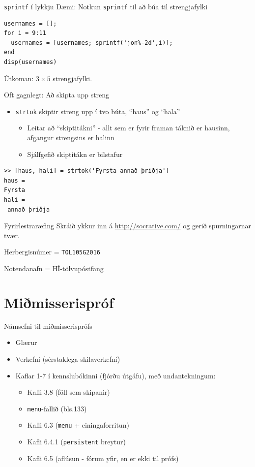 \documentclass{beamer}
\begin{document}
\begin{frame}[fragile]{\texttt{sprintf} í lykkju}
Dæmi: Notkun \texttt{sprintf} til að búa til strengjafylki

\begin{verbatim}
usernames = [];
for i = 9:11
  usernames = [usernames; sprintf('jon%-2d',i)];
end
disp(usernames)
\end{verbatim}
Útkoman: $3\times 5$ strengjafylki.
\end{frame}

\begin{frame}[fragile]{Oft gagnlegt: Að skipta upp streng}
\begin{itemize}
  \item \texttt{strtok} skiptir streng upp í tvo búta, ``haus'' og ``hala''
  \begin{itemize}
   \item Leitar að ``skiptitákni'' - allt sem er fyrir framan táknið er hausinn, afgangur strengsins er halinn
   \item Sjálfgefið skiptitákn er bilstafur
  \end{itemize}
\end{itemize}
\begin{verbatim}
>> [haus, hali] = strtok('Fyrsta annað þriðja')
haus =
Fyrsta
hali =
 annað þriðja
\end{verbatim}

\end{frame}


\begin{frame}{Fyrirlestraræfing}
Skráið ykkur inn á \url{http://socrative.com/} og gerið spurningarnar tvær.

Herbergisnúmer = \texttt{TOL105G2016}

Notendanafn = HÍ-tölvupóstfang
\end{frame}

\section{Miðmisserispróf}

\begin{frame}{Námsefni til miðmisserisprófs}
\begin{itemize}
 \item Glærur
 \item Verkefni (sérstaklega skilaverkefni)
 \item Kaflar 1-7 í kennslubókinni (fjórðu útgáfu), með undantekningum:
 \begin{itemize}
  \item Kafli 3.8 (föll sem skipanir)
  \item \texttt{menu}-fallið (bls.133)
  \item Kafli 6.3 (\texttt{menu} + einingaforritun)
  \item Kafli 6.4.1 (\texttt{persistent} breytur)
  \item Kafli 6.5 (aflúsun - fórum yfir, en er ekki til prófs)
 \end{itemize}
\end{itemize}
\end{frame}
\end{document}
